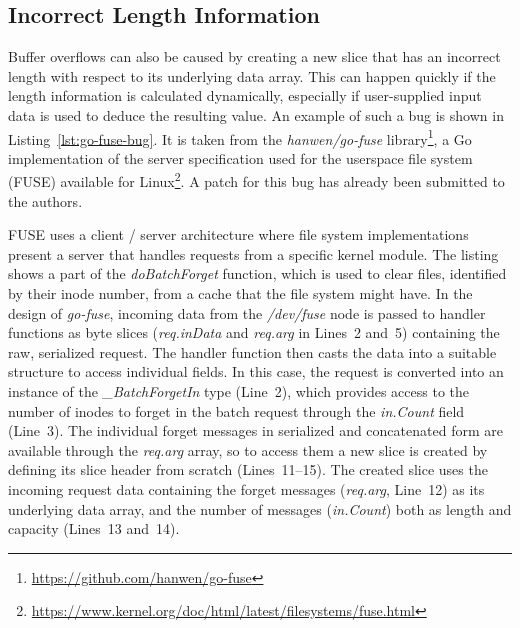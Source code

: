 
\subsection{Incorrect Length Information}\label{subsec:unsafe-security-problems:slice-casts:incorrect-length}

Buffer overflows can also be caused by creating a new slice that has an incorrect length with respect to its underlying
data array.
This can happen quickly if the length information is calculated dynamically, especially if user-supplied input data is
used to deduce the resulting value.
An example of such a bug is shown in Listing~\ref{lst:go-fuse-bug}.
It is taken from the \textit{hanwen/go-fuse} library\footnote{\url{https://github.com/hanwen/go-fuse}}, a Go
implementation of the server specification used for the userspace file system (\acrshort{FUSE}) available for
Linux\footnote{\url{https://www.kernel.org/doc/html/latest/filesystems/fuse.html}}.
A patch for this bug has already been submitted to the authors.



\acrshort{FUSE} uses a client / server architecture where file system implementations present a server that handles
requests from a specific kernel module.
The listing shows a part of the \textit{doBatchForget} function, which is used to clear files, identified by their inode
number, from a cache that the file system might have.
In the design of \textit{go-fuse}, incoming data from the \textit{/dev/fuse} node is passed to handler functions as byte
slices (\textit{req.inData} and \textit{req.arg} in Lines~2 and~5) containing the raw, serialized request.
The handler function then casts the data into a suitable structure to access individual fields.
In this case, the request is converted into an instance of the \textit{\_BatchForgetIn} type (Line~2), which provides
access to the number of inodes to forget in the batch request through the \textit{in.Count} field (Line~3).
The individual forget messages in serialized and concatenated form are available through the \textit{req.arg} array, so
to access them a new slice is created by defining its slice header from scratch (Lines~11--15).
The created slice uses the incoming request data containing the forget messages (\textit{req.arg}, Line~12) as its
underlying data array, and the number of messages (\textit{in.Count}) both as length and capacity (Lines~13 and~14).

